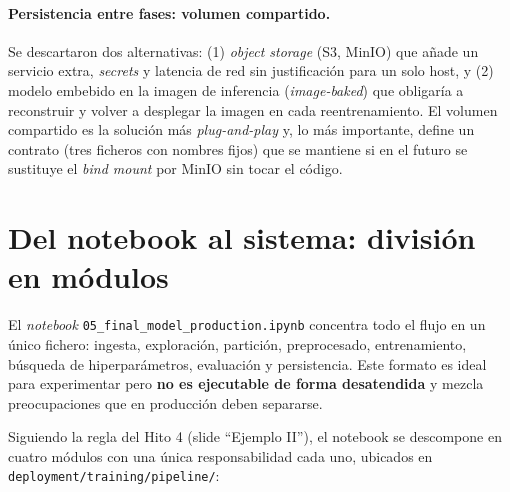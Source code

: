 \documentclass[12pt,a4paper]{report}
\begin{document}
\paragraph{Persistencia entre fases: volumen compartido.} Se descartaron dos alternativas: (1) \textit{object storage} (S3, MinIO) que añade un servicio extra, \textit{secrets} y latencia de red sin justificación para un solo host, y (2) modelo embebido en la imagen de inferencia (\textit{image-baked}) que obligaría a reconstruir y volver a desplegar la imagen en cada reentrenamiento. El volumen compartido es la solución más \textit{plug-and-play} y, lo más importante, define un contrato (tres ficheros con nombres fijos) que se mantiene si en el futuro se sustituye el \textit{bind mount} por MinIO sin tocar el código.

\section{Del notebook al sistema: división en módulos}
\label{sec:hito4-modularizacion}

El \textit{notebook} \texttt{05\_final\_model\_production.ipynb} concentra todo el flujo en un único fichero: ingesta, exploración, partición, preprocesado, entrenamiento, búsqueda de hiperparámetros, evaluación y persistencia. Este formato es ideal para experimentar pero \textbf{no es ejecutable de forma desatendida} y mezcla preocupaciones que en producción deben separarse.

Siguiendo la regla del Hito 4 (slide ``Ejemplo II''), el notebook se descompone en cuatro módulos con una única responsabilidad cada uno, ubicados en \texttt{deployment/training/pipeline/}:
\end{document}
